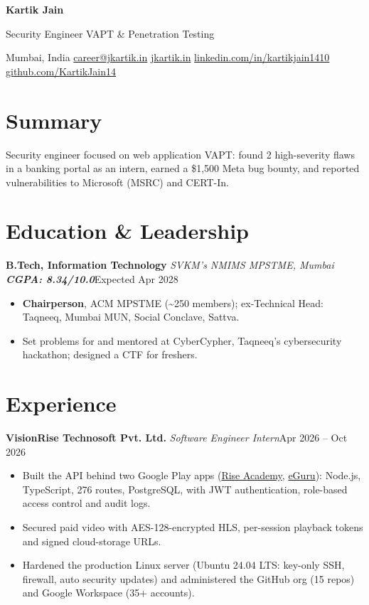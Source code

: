 \documentclass[10pt, a4paper]{article}
\newcommand{\role}[3]{\par\vspace{2.5pt}\textbf{#1} \textbar{} \textit{#2}\hfill #3\par}
\newcommand{\lnk}[2]{\href{#1}{\color{linkc}#2}}
\newcommand{\sep}{\enspace\textbar\enspace}
\begin{document}
\begin{center}
  {\fontsize{22pt}{24pt}\selectfont\bfseries Kartik Jain}\par\vspace{3pt}
  {\normalsize Security Engineer \textbar{} VAPT \& Penetration Testing}\par\vspace{3pt}
  {\small Mumbai, India\sep
  \lnk{mailto:career@jkartik.in}{career@jkartik.in}\sep
  \lnk{https://jkartik.in/}{jkartik.in}\sep
  \lnk{https://linkedin.com/in/kartikjain1410}{linkedin.com/in/kartikjain1410}\sep
  \lnk{https://github.com/KartikJain14}{github.com/KartikJain14}}
\end{center}

\section{Summary}
Security engineer focused on web application VAPT: found 2 high-severity flaws in a banking portal as an
intern, earned a \$1,500 Meta bug bounty, and reported vulnerabilities to Microsoft (MSRC) and CERT-In.

\section{Education \& Leadership}
\role{B.Tech, Information Technology}{SVKM's NMIMS MPSTME, Mumbai \textbar{} \textup{\textbf{CGPA: 8.34/10.0}}}{Expected Apr 2028}
\begin{itemize}
  \item \textbf{Chairperson}, ACM MPSTME (\textasciitilde{}250 members); ex-Technical Head: Taqneeq, Mumbai MUN, Social Conclave, Sattva.
  \item Set problems for and mentored at CyberCypher, Taqneeq's cybersecurity hackathon; designed a CTF for freshers.
\end{itemize}

\section{Experience}
\role{VisionRise Technosoft Pvt. Ltd.}{Software Engineer Intern}{Apr 2026 -- Oct 2026}
\begin{itemize}
  \item Built the API behind two Google Play apps (\lnk{https://play.google.com/store/apps/details?id=tech.riseinstitute.app}{Rise Academy}, \lnk{https://play.google.com/store/apps/details?id=app.eguru.lms}{eGuru}): Node.js, TypeScript, 276 routes, PostgreSQL,
  with JWT authentication, role-based access control and audit logs.
  \item Secured paid video with AES-128-encrypted HLS, per-session playback tokens and signed cloud-storage URLs.
  \item Hardened the production Linux server (Ubuntu 24.04 LTS: key-only SSH, firewall, auto security updates) and
  administered the GitHub org (15 repos) and Google Workspace (35+ accounts).
\end{itemize}
\end{document}
